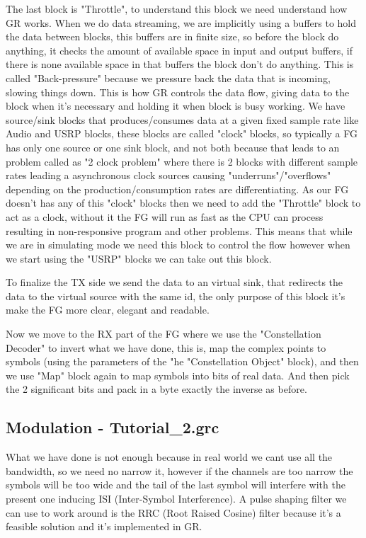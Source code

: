 \documentclass[a4paper, 10pt, conference]{ieeeconf}      %
\begin{document}
        The last block is "Throttle", to understand this block we need understand how GR works. When we do data streaming, we are implicitly using a buffers to hold the data between blocks, this buffers are in finite size, so before the block do anything, it checks the amount of available space in input and output buffers, if there is none available space in that buffers the block don't do anything. This is called "Back-pressure" because we pressure back the data that is incoming, slowing things down. This is how GR controls the data flow, giving data to the block when it's necessary and holding it when block is busy working. We have source/sink blocks that produces/consumes data at a given fixed sample rate like Audio and USRP blocks, these blocks are called "clock" blocks, so typically a FG has only one source or one sink block, and not both because that leads to an problem called as "2 clock problem" where there is 2 blocks with different sample rates leading a asynchronous clock sources causing "underruns"/"overflows" depending on the production/consumption rates are differentiating. As our FG doesn't has any of this "clock" blocks then we need to add the "Throttle" block to act as a clock, without it the FG will run as fast as the CPU can process resulting in non-responsive program and other problems. This means that while we are in simulating mode we need this block to control the flow however when we start using the "USRP" blocks we can take out this block.
        
        To finalize the TX side we send the data to an virtual sink, that redirects the data to the virtual source with the same id, the only purpose of this block it's make the FG more clear, elegant and readable.
        
        Now we move to the RX part of the FG where we use the "Constellation Decoder" to invert what we have done, this is, map the complex points to symbols (using the parameters of the "he "Constellation Object" block), and then we use "Map" block again to map symbols into bits of real data. And then pick the 2 significant bits and pack in a byte exactly the inverse as before.
        
        
\subsection{Modulation - Tutorial\_2.grc}
    What we have done is not enough because in real world we cant use all the bandwidth, so we need no narrow it, however if the channels are too narrow the symbols will be too wide and the tail of the last symbol will interfere with the present one inducing ISI (Inter-Symbol Interference). A pulse shaping filter we can use to work around is the RRC (Root Raised Cosine) filter because it's a feasible solution and it's implemented in GR.      
    
\end{document}
